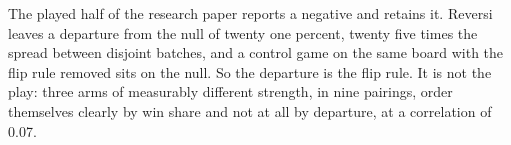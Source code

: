 The played half of the research paper reports a negative and retains it. Reversi leaves a departure from the
null of twenty one percent, twenty five times the spread between disjoint batches, and a control
game on the same board with the flip rule removed sits on the null. So the departure is the flip
rule. It is not the play: three arms of measurably different strength, in nine pairings, order
themselves clearly by win share and not at all by departure, at a correlation of 0.07.
\cleardoublepage

